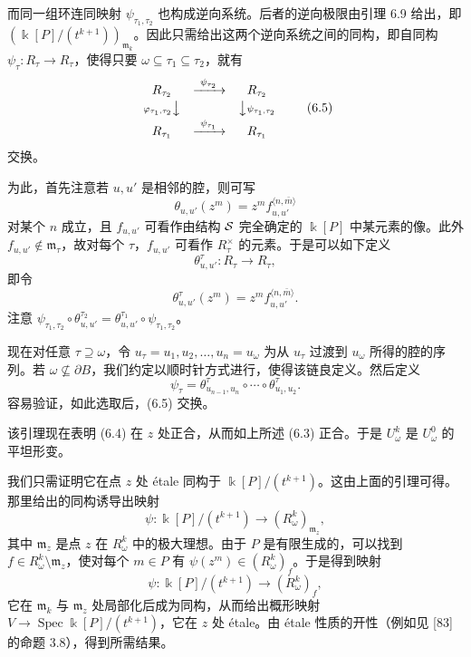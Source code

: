 而同一组环连同映射 $\psi_{\tau_1,\tau_2}$ 也构成逆向系统。后者的逆向极限由引理 6.9 给出，即 $(\Bbbk[P]/(t^{k+1}))_{\mathfrak m_k}$。因此只需给出这两个逆向系统之间的同构，即自同构 $\psi_\tau:R_\tau\to R_\tau$，使得只要 $\omega\subseteq\tau_1\subseteq\tau_2$，就有
\begin{equation}
  \begin{array}{ccc}
    R_{\tau_2} & \xrightarrow{\ \psi_{\tau_2}\ } & R_{\tau_2}\\[2pt]
    {\scriptstyle\varphi_{\tau_1,\tau_2}}\big\downarrow & & \big\downarrow{\scriptstyle\psi_{\tau_1,\tau_2}}\\[2pt]
    R_{\tau_1} & \xrightarrow{\ \psi_{\tau_1}\ } & R_{\tau_1}
  \end{array} \tag{6.5}
\end{equation}
交换。

为此，首先注意若 $u,u'$ 是相邻的腔，则可写
\[
  \theta_{u,u'}(z^m)=z^mf_{u,u'}^{\langle n,\bar m\rangle}
\]
对某个 $n$ 成立，且 $f_{u,u'}$ 可看作由结构 $\mathcal{S}$ 完全确定的 $\Bbbk[P]$ 中某元素的像。此外 $f_{u,u'}\notin\mathfrak m_\tau$，故对每个 $\tau$，$f_{u,u'}$ 可看作 $R_\tau^\times$ 的元素。于是可以如下定义
\[
  \theta^\tau_{u,u'}:R_\tau\to R_\tau,
\]
即令
\[
  \theta^\tau_{u,u'}(z^m)=z^mf_{u,u'}^{\langle n,\bar m\rangle}.
\]
注意 $\psi_{\tau_1,\tau_2}\circ\theta^{\tau_2}_{u,u'}=\theta^{\tau_1}_{u,u'}\circ\psi_{\tau_1,\tau_2}$。

现在对任意 $\tau\supseteq\omega$，令 $u_\tau=u_1,u_2,\ldots,u_n=u_\omega$ 为从 $u_\tau$ 过渡到 $u_\omega$ 所得的腔的序列。若 $\omega\not\subseteq\partial B$，我们约定以顺时针方式进行，使得该链良定义。然后定义
\[
  \psi_\tau=\theta^\tau_{u_{n-1},u_n}\circ\cdots\circ\theta^\tau_{u_1,u_2}.
\]
容易验证，如此选取后，(6.5) 交换。


该引理现在表明 (6.4) 在 $z$ 处正合，从而如上所述 (6.3) 正合。于是 $U^k_\omega$ 是 $U^0_\omega$ 的平坦形变。

我们只需证明它在点 $z$ 处 étale 同构于 $\Bbbk[P]/(t^{k+1})$。这由上面的引理可得。那里给出的同构诱导出映射
\[
  \psi:\Bbbk[P]/(t^{k+1})\to(R^k_\omega)_{\mathfrak m_z},
\]
其中 $\mathfrak m_z$ 是点 $z$ 在 $R^k_\omega$ 中的极大理想。由于 $P$ 是有限生成的，可以找到 $f\in R^k_\omega\setminus\mathfrak m_z$，使对每个 $m\in P$ 有 $\psi(z^m)\in(R^k_\omega)_f$。于是得到映射
\[
  \psi:\Bbbk[P]/(t^{k+1})\to(R^k_\omega)_f,
\]
它在 $\mathfrak m_k$ 与 $\mathfrak m_z$ 处局部化后成为同构，从而给出概形映射 $V\to\operatorname{Spec}\Bbbk[P]/(t^{k+1})$，它在 $z$ 处 étale。由 étale 性质的开性（例如见 [83] 的命题 3.8），得到所需结果。

